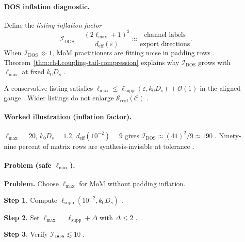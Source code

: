 \paragraph{DOS inflation diagnostic.}
Define the \emph{listing inflation factor}
\begin{equation}
\label{eq:ch4.dos-inflation}
\mathcal{I}_{\mathrm{DOS}}
=
\frac{(2\ell_{\max}+1)^{2}}{d_{\mathrm{eff}}(\varepsilon)}
\approx
\frac{\text{channel labels}}{\text{export directions}}.
\end{equation}
When \(\mathcal{I}_{\mathrm{DOS}}\gg1\), MoM practitioners are fitting noise in padding rows \cite{harrington2001,devaney2004,hansen1988}.
Theorem~\ref{thm:ch4.coupling-tail-compression} explains why \(\mathcal{I}_{\mathrm{DOS}}\) grows with \(\ell_{\max}\) at fixed \(k_{0}D_{s}\)
\cite{stratton1941,jackson1999}.

\begin{corollary}
\label{cor:ch4.safe-listing-width}
A conservative listing satisfies \(\ell_{\max}\le\ell_{\mathrm{supp}}(\varepsilon,k_{0}D_{s})+\mathcal{O}(1)\) in the aligned gauge
\cite{hansen1988,harrington2001}. Wider listings do not enlarge \(\mathcal{S}_{\mathrm{real}}(\mathcal{C})\) \cite{devaney2004,stratton1941}.
\end{corollary}

\paragraph{Worked illustration (inflation factor).}
\(\ell_{\max}=20\), \(k_{0}D_{s}=1.2\), \(d_{\mathrm{eff}}(10^{-2})=9\) gives \(\mathcal{I}_{\mathrm{DOS}}\approx(41)^{2}/9\approx190\)
\cite{hansen1988,harrington2001,devaney2004}. Ninety-nine percent of matrix rows are synthesis-invisible at tolerance \cite{stratton1941}.

\paragraph{Problem (safe \(\ell_{\max}\)).}
\textbf{Problem.} Choose \(\ell_{\max}\) for MoM without padding inflation.

\textbf{Step 1.} Compute \(\ell_{\mathrm{supp}}(10^{-2},k_{0}D_{s})\) \cite{hansen1988,harrington2001}.

\textbf{Step 2.} Set \(\ell_{\max}=\ell_{\mathrm{supp}}+\Delta\) with \(\Delta\le2\) \cite{devaney2004}.

\textbf{Step 3.} Verify \(\mathcal{I}_{\mathrm{DOS}}\lesssim10\) \cite{stratton1941,jackson1999}.

